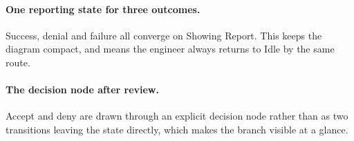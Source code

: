 \paragraph{One reporting state for three outcomes.}
Success, denial and failure all converge on Showing Report. This keeps the
diagram compact, and means the engineer always returns to Idle by the same
route.

\paragraph{The decision node after review.}
Accept and deny are drawn through an explicit decision node rather than as two
transitions leaving the state directly, which makes the branch visible at a
glance.
